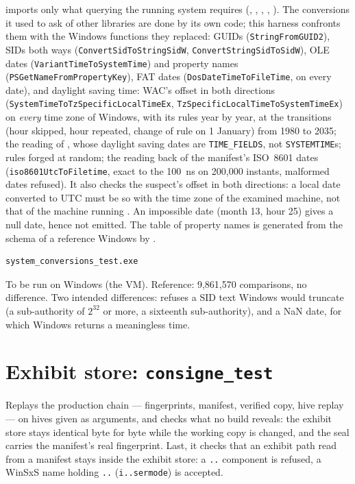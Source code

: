 \documentclass[11pt,a4paper,oneside]{report}
\begin{document}
\wac{} imports only what querying the running system requires
(, , , ,
). The conversions it used to ask of other libraries are
done by its own code; this harness confronts them with the Windows functions
they replaced: GUIDs (\texttt{StringFromGUID2}), SIDs both ways
(\texttt{ConvertSidToStringSidW}, \texttt{ConvertStringSidToSidW}), OLE dates
(\texttt{VariantTimeToSystemTime}) and property names
(\texttt{PSGetNameFromPropertyKey}), FAT dates (\texttt{DosDateTimeToFileTime},
on every date), and daylight saving time: WAC's offset in both directions
(\texttt{SystemTimeToTzSpecificLocalTimeEx}, \texttt{TzSpecificLocalTimeToSystemTimeEx})
on \emph{every} time zone of Windows, with its rules year by year, at the
transitions (hour skipped, hour repeated, change of rule on 1 January) from
1980 to 2035; the reading of , whose daylight saving dates are \texttt{TIME\_FIELDS},
not \texttt{SYSTEMTIME}s; rules forged at random; the reading back of the
manifest's ISO~8601 dates (\texttt{iso8601UtcToFiletime}, exact to the 100~ns on
200,000 instants, malformed dates refused). It also checks the
suspect's offset in both directions: a local
date converted to UTC must be so with the time zone of the examined machine,
not that of the machine running \wac{}. An impossible date (month 13, hour 25)
gives a null date, hence not emitted. The table of property names is generated
from the schema of a reference Windows by .

\begin{lstlisting}
system_conversions_test.exe
\end{lstlisting}

To be run on Windows (the VM). Reference: 9,861,570 comparisons, no difference.
Two intended differences: \wac{} refuses a SID text Windows would truncate (a
sub-authority of $2^{32}$ or more, a sixteenth sub-authority), and a NaN date,
for which Windows returns a meaningless time.

\section{Exhibit store: \texttt{consigne\_test}}

Replays the production chain — fingerprints, manifest, verified copy, hive
replay — on hives given as arguments, and checks what no build reveals: the
exhibit store stays identical byte for byte while the working copy is changed,
and the seal carries the manifest's real fingerprint. Last, it checks that an
exhibit path read from a manifest stays inside the exhibit store: a
\texttt{..} component is refused, a WinSxS name holding \texttt{..}
(\texttt{i..sermode}) is accepted.
\end{document}
